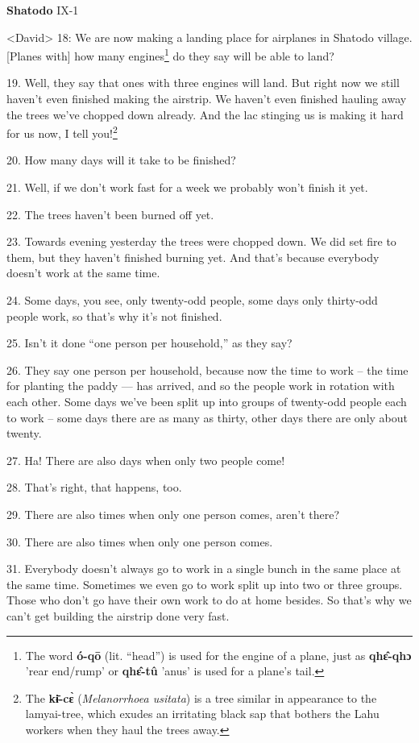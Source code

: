 \setcounter{footnote}{0}

\textbf{Shatodo} IX-1

<David> 18: We are now making a landing place for airplanes in
Shatodo village. [Planes with] how many engines\footnote{The word \textbf{ó-qō} (lit. ``head'') is used for the engine of a plane, just as \textbf{qhɛ̂-qhɔ} 'rear end/rump' or \textbf{qhɛ̂-tû} 'anus' is used for a plane's tail.} do they say will be able to
land?

19. Well, they say that ones with three engines will land. But right now we still
haven't even finished making the airstrip. We haven't even finished hauling away
the trees we've chopped down already. And the lac stinging us is making it hard
for us now, I tell you!\footnote{The \textbf{kɨ̄-cɛ̀} (\textit{Melanorrhoea usitata}) is a tree similar in appearance to the lamyai-tree, which exudes an irritating black sap that bothers the Lahu workers when they haul the trees away.}

20. How many days will it take to be finished?

21. Well, if we don't work fast for a week we probably won't finish it yet.

22. The trees haven't been burned off yet.

23. Towards evening yesterday the trees were chopped down. We did set fire to them,
but they haven't finished burning yet. And that's because everybody doesn't work
at the same time.

24. Some days, you see, only twenty-odd people, some days only thirty-odd people
work, so that's why it's not finished.

25. Isn't it done ``one person per household,'' as they say?

26. They say one person per household, because now the time to work -- the time
for planting the paddy --- has arrived, and so the people work in rotation with
each other. Some days we've been split up into groups of twenty-odd people each
to work -- some days there are as many as thirty, other days there are only about
twenty.

27. Ha! There are also days when only two people come!

28. That's right, that happens, too.

29. There are also times when only one person comes, aren't there?

30. There are also times when only one person comes.

31. Everybody doesn't always go to work in a single bunch in the same place at
the same time. Sometimes we even go to work split up into two or three groups.
Those who don't go have their own work to do at home besides. So that's why we
can't get building the airstrip done very fast.

